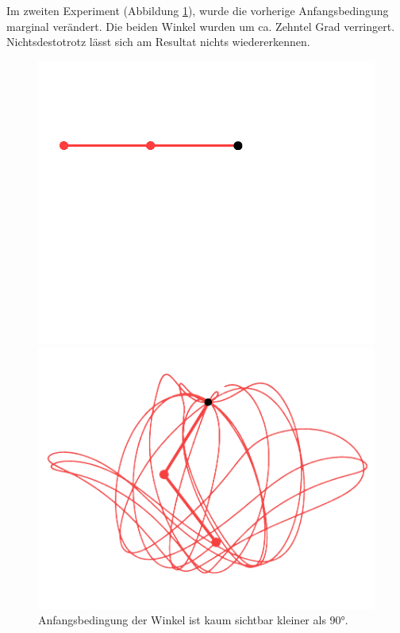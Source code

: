 Im zweiten Experiment (Abbildung \ref{fig:pendel_bei_weniger_90}), wurde die vorherige
Anfangsbedingung marginal verändert.
Die beiden Winkel wurden um ca. Zehntel Grad verringert.
Nichtsdestotrotz lässt sich am Resultat nichts wiedererkennen.
\begin{figure}
    \centering
    \begin{minipage}{0.45\textwidth}
        \centering
        \includegraphics[width=\textwidth]{papers/doppelpendel/images/pendel_stand_kleiner_90.png}
    \end{minipage}
    \hfill
    \begin{minipage}{0.45\textwidth}
        \centering
        \includegraphics[width=\textwidth]{papers/doppelpendel/images/pendel_spur_kleiner_90.png}
    \end{minipage}
    \caption{Anfangsbedingung der Winkel ist kaum sichtbar kleiner als 90°.}
    \label{fig:pendel_bei_weniger_90}
\end{figure}

